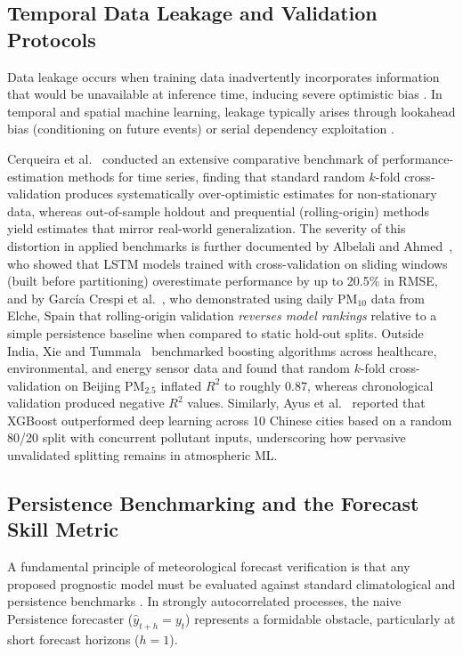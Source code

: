 \subsection{Temporal Data Leakage and Validation Protocols}
Data leakage occurs when training data inadvertently incorporates information that would be unavailable at inference time, inducing severe optimistic bias \cite{kaufman2012}. In temporal and spatial machine learning, leakage typically arises through lookahead bias (conditioning on future events) or serial dependency exploitation \cite{bergmeir2012}.

Cerqueira et al.~\cite{cerqueira2020} conducted an extensive comparative benchmark of performance-estimation methods for time series, finding that standard random $k$-fold cross-validation produces systematically over-optimistic estimates for non-stationary data, whereas out-of-sample holdout and prequential (rolling-origin) methods yield estimates that mirror real-world generalization. The severity of this distortion in applied benchmarks is further documented by Albelali and Ahmed~\cite{albelali2025}, who showed that LSTM models trained with cross-validation on sliding windows (built before partitioning) overestimate performance by up to 20.5\% in RMSE, and by Garc{\'i}a Crespi et al.~\cite{garciacrespi2026}, who demonstrated using daily PM$_{10}$ data from Elche, Spain that rolling-origin validation \emph{reverses model rankings} relative to a simple persistence baseline when compared to static hold-out splits. Outside India, Xie and Tummala~\cite{xie2025} benchmarked boosting algorithms across healthcare, environmental, and energy sensor data and found that random $k$-fold cross-validation on Beijing $\text{PM}_{2.5}$ inflated $R^2$ to roughly $0.87$, whereas chronological validation produced negative $R^2$ values. Similarly, Ayus et al.~\cite{ayus2023} reported that XGBoost outperformed deep learning across 10 Chinese cities based on a random 80/20 split with concurrent pollutant inputs, underscoring how pervasive unvalidated splitting remains in atmospheric ML.

\subsection{Persistence Benchmarking and the Forecast Skill Metric}
A fundamental principle of meteorological forecast verification is that any proposed prognostic model must be evaluated against standard climatological and persistence benchmarks \cite{murphy1992}\cite{jolliffe2012}. In strongly autocorrelated processes, the naive Persistence forecaster ($\hat{y}_{t+h} = y_t$) represents a formidable obstacle, particularly at short forecast horizons ($h=1$).

